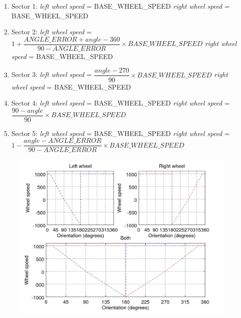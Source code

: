 \begin{enumerate}
	\item Sector 1: \newline \textit{left wheel speed} = BASE\_WHEEL\_SPEED \newline
	\textit{right wheel speed} = BASE\_WHEEL\_SPEED

	\item Sector 2: \newline \textit{left wheel speed} = \(1 + \dfrac{ANGLE\_ERROR + angle - 360}{90 - ANGLE\_ERROR} \times BASE\_WHEEL\_SPEED\) \newline
	\textit{right wheel speed} = BASE\_WHEEL\_SPEED

	\item Sector 3: \newline\textit{left wheel speed} = \(\dfrac{angle - 270}{90} \times BASE\_WHEEL\_SPEED\) \newline
	\textit{right wheel speed} = BASE\_WHEEL\_SPEED

	\item Sector 4: \newline\textit{left wheel speed} = BASE\_WHEEL\_SPEED  \newline
	\textit{right wheel speed} = \(\dfrac{90 - angle}{90} \times BASE\_WHEEL\_SPEED\)

	\item Sector 5: \newline\textit{left wheel speed} = BASE\_WHEEL\_SPEED  \newline\newline
	\textit{right wheel speed} = \(1 - \dfrac{angle - ANGLE\_ERROR}{90 - ANGLE\_ERROR} \times BASE\_WHEEL\_SPEED\)

\end{enumerate}

\begin{figure}[h]
	\begin{minipage}{.75\textwidth}
		\includegraphics[width=1.2\linewidth]{control}
		\label{fig:control}
	\end{minipage}
\end{figure}

